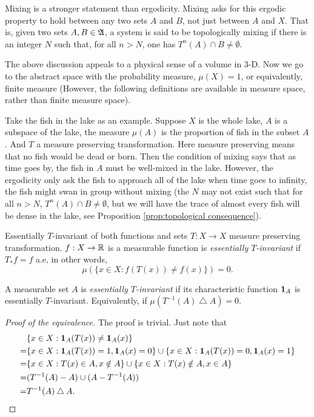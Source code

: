 \documentclass[12pt,a4paper]{article}
\begin{document}
	Mixing is a stronger statement than ergodicity. Mixing asks for this ergodic property to hold between any two sets $A$ and $B$, not just between $A$ and $X$. That is, given two sets $A,B\in \mathfrak{A}$, a system is said to be topologically mixing if there is an integer $N$ such that, for all $n>N$, one has $T^n(A)\cap B\neq \emptyset$.
	
	The above discussion appeals to a physical sense of a volume in 3-D. Now we go to the abstract space with the probability measure, $\mu(X)=1$, or equivalently, finite measure (However, the following definitions are available in measure space, rather than finite measure space).
	
		
	Take the fish in the lake as an example. Suppose $X$ is the whole lake, $A$ is a subspace of the lake, the measure $\mu(A)$ is the proportion of fish in the subset $A$. And $T$ a measure preserving transformation. Here measure preserving means that no fish would be dead or born. Then the condition of mixing says that as time goes by, the fish in $A$ must be well-mixed in the lake. However, the ergodicity only ask the fish to approach all of the lake when time goes to infinity, the fish might swan in group without mixing (the $N$ may not exist such that for all $n>N$, $T^n(A)\cap B\neq \emptyset$, but we will have the trace of almost every fish will be dense in the lake, see Proposition \ref{prop:topological consequence}).
	
	\begin{definition}{Essentially $T$-invariant of both functions and sets}{}
		$T:X\rightarrow X$ measure preserving transformation. $f:X\rightarrow \mathbb{R}$ is a measurable function is \emph{essentially $T$-invariant} if $T_* f=f$ a.e, in other words, 
		$$
		\mu(\{x\in X: f(T(x))\neq f(x)\})=0.
		$$
		
		A measurable set $A$ is \emph{essentially $T$-invariant} if its characteristic function $\mathbf{1}_A$ is essentially $T$-invariant. Equivalently, if $\mu(T^{-1}(A)\bigtriangleup A)=0$.
	\end{definition}

	\begin{proof}[Proof of the equivalence]
		The proof is trivial. Just note that 
		\begin{align*}
				&\{x\in X: \mathbf{1}_A(T(x))\neq \mathbf{1}_A(x)\}\\
				=&\{x\in X:\mathbf{1}_A(T(x))=1, \mathbf{1}_A(x)=0\}\cup\{x\in X:\mathbf{1}_A(T(x))=0, \mathbf{1}_A(x)=1\}\\
				=&\{x\in X: T(x)\in A, x\notin A\}\cup \{x\in X: T(x)\notin A, x\in A\}\\
				=&(T^{-1}(A)-A)\cup (A-T^{-1}(A))\\
				=&T^{-1}(A)\bigtriangleup A.
		\end{align*}
	\end{proof}
\end{document}
